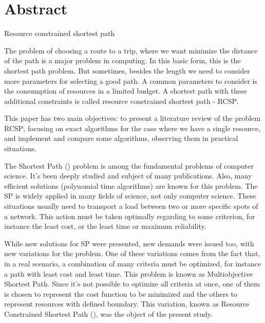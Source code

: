 \chapter*{Abstract}

\begin{center}
  \Large{Resource constrained shortest path}
\end{center}



The problem of choosing a route to a trip, where we want
minimize the distance of the path is a major problem in
computing. In this basic form, this is the shortest path problem. But 
sometimes, besides the length we need to consider more  
parameters for selecting a good path. A common parameters
to consider is the consumption of resources in a limited budget. A 
shortest path with these additional constraints is called resource 
constrained shortest path - \textsc{RCSP}.

This paper has two main objectives: to present a literature review of 
the problem \textsc{RCSP}, focusing on exact algorithms for
the case where we have a single resource, and implement and compare
some algorithms, observing them in practical situations.



The Shortest Path (\spp) problem is among the fundamental problems of 
computer
science. It's been deeply studied and subject of many publications. Also, many
efficient solutions (polynomial time algorithms) are known for this
problem. The
SP is widely applied in many fields of science, not only computer
science. These
situations usually need to transport a load between two or more specific spots
of a network. This action must be taken optimally regarding to some criterion,
for instance the least cost, or the least time or maximum reliability.

While new solutions for SP were presented, new demands were issued
too, with new
variations for the problem. One of these variations comes from the
fact that, in
a real scenario, a combination of many criteria must be optimized, for instance
a path with least cost and least time. This problem is known as Multiobjective
Shortest Path. Since it's not possible to optimize all criteria at once, one of
them is chosen to represent the cost function to be minimized and the others to
represent resources with defined boundary. This variation, known as Resource
Constrained Shortest Path (\rcsp), was the object of the present study.

